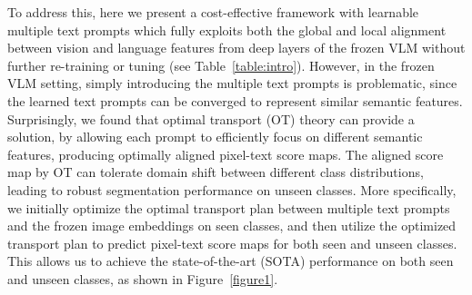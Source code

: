 \documentclass[nohyperref]{article}
\theoremstyle{plain}
\theoremstyle{definition}
\theoremstyle{remark}
\begin{document}
To address this,  here we present a cost-effective framework with learnable multiple text prompts which fully exploits both the global and local alignment between vision and language features from deep layers of the frozen VLM without further re-training or tuning (see Table~\ref{table:intro}). 
However, in the frozen VLM setting,  %
simply introducing the multiple text prompts is problematic, since the learned text prompts can be converged to represent similar semantic features. %
Surprisingly, we found that optimal transport (OT) theory  can provide a solution, by allowing each prompt to efficiently focus on different semantic features, producing optimally aligned pixel-text score maps. %
The aligned score map by OT can tolerate domain shift between different class distributions, leading to robust segmentation performance on unseen classes. %
More specifically, we initially optimize the optimal transport plan between multiple text prompts and the frozen image embeddings on seen classes, and then utilize the optimized transport plan to predict pixel-text score maps for both seen and unseen classes. This allows us to achieve the state-of-the-art (SOTA) performance on both seen and unseen classes, as shown in Figure~\ref{figure1}.    
\end{document}

